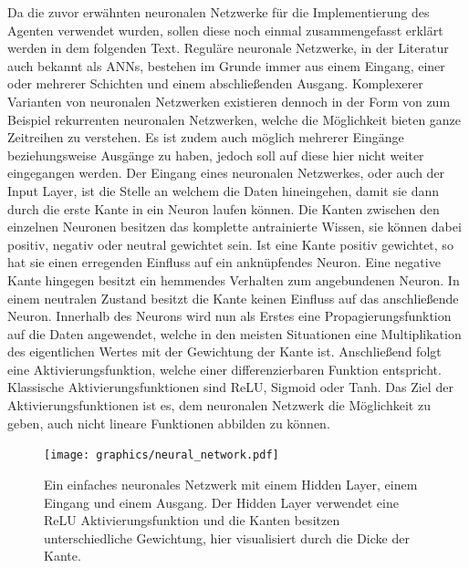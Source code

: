\documentclass[]{iat}
\begin{document}
Da die zuvor erwähnten neuronalen Netzwerke für die Implementierung des Agenten verwendet wurden, sollen diese noch einmal zusammengefasst erklärt werden in dem folgenden Text. Reguläre neuronale Netzwerke, in der Literatur auch bekannt als ANNs, bestehen im Grunde immer aus einem Eingang, einer oder mehrerer Schichten und einem abschließenden Ausgang. Komplexerer Varianten von neuronalen Netzwerken existieren dennoch in der Form von zum Beispiel rekurrenten neuronalen Netzwerken, welche die Möglichkeit bieten ganze Zeitreihen zu verstehen. Es ist zudem auch möglich mehrerer Eingänge beziehungsweise Ausgänge zu haben, jedoch soll auf diese hier nicht weiter eingegangen werden. Der Eingang eines neuronalen Netzwerkes, oder auch der Input Layer, ist die Stelle an welchem die Daten hineingehen, damit sie dann durch die erste Kante in ein Neuron laufen können. Die Kanten zwischen den einzelnen Neuronen besitzen das komplette antrainierte Wissen, sie können dabei positiv, negativ oder neutral gewichtet sein. Ist eine Kante positiv gewichtet, so hat sie einen erregenden Einfluss auf ein anknüpfendes Neuron. Eine negative Kante hingegen besitzt ein hemmendes Verhalten zum angebundenen Neuron. In einem neutralen Zustand besitzt die Kante keinen Einfluss auf das anschließende Neuron. Innerhalb des Neurons wird nun als Erstes eine Propagierungsfunktion auf die Daten angewendet, welche in den meisten Situationen eine Multiplikation des eigentlichen Wertes mit der Gewichtung der Kante ist. Anschließend folgt eine Aktivierungsfunktion, welche einer differenzierbaren Funktion entspricht. Klassische Aktivierungsfunktionen sind ReLU, Sigmoid oder Tanh. Das Ziel der Aktivierungsfunktionen ist es, dem neuronalen Netzwerk die Möglichkeit zu geben, auch nicht lineare Funktionen abbilden zu können. \cite[]{KrusComp2015}
\begin{figure}[H]
    \texttt{[image: graphics/neural\_network.pdf]}
    \centering
    \caption{Ein einfaches neuronales Netzwerk mit einem Hidden Layer, einem Eingang und einem Ausgang. Der Hidden Layer verwendet eine ReLU Aktivierungsfunktion und die Kanten besitzen unterschiedliche Gewichtung, hier visualisiert durch die Dicke der Kante.}
    \label{abb:nn}
\end{figure}
\end{document}
